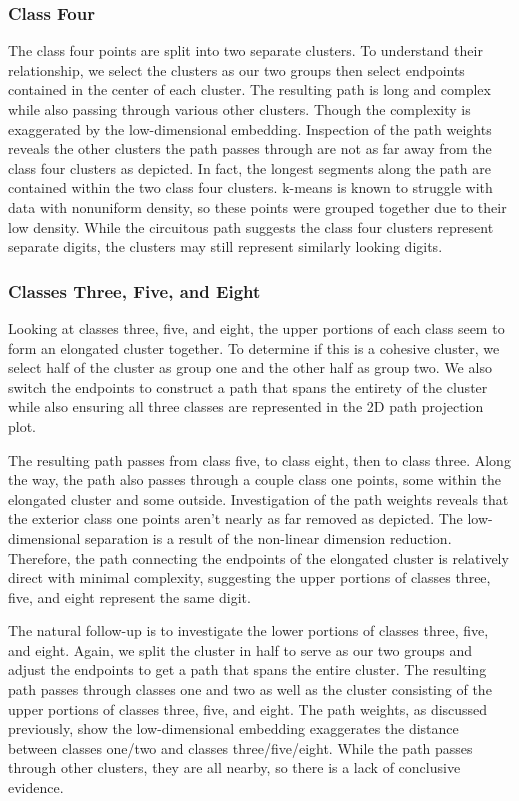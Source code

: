 \documentclass{article}
\begin{document}
\subsubsection{Class Four}
The class four points are split into two separate clusters. To understand their relationship, we select the clusters as our two groups then select endpoints contained in the center of each cluster. The resulting path is long and complex while also passing through various other clusters. Though the complexity is exaggerated by the low-dimensional embedding. Inspection of the path weights reveals the other clusters the path passes through are not as far away from the class four clusters as depicted. In fact, the longest segments along the path are contained within the two class four clusters. k-means is known to struggle with data with nonuniform density, so these points were grouped together due to their low density. While the circuitous path suggests the class four clusters represent separate digits, the clusters may still represent similarly looking digits.

\subsubsection{Classes Three, Five, and Eight}
Looking at classes three, five, and eight, the upper portions of each class seem to form an elongated cluster together. To determine if this is a cohesive cluster, we select half of the cluster as group one and the other half as group two. We also switch the endpoints to construct a path that spans the entirety of the cluster while also ensuring all three classes are represented in the 2D path projection plot.

The resulting path passes from class five, to class eight, then to class three. Along the way, the path also passes through a couple class one points, some within the elongated cluster and some outside. Investigation of the path weights reveals that the exterior class one points aren't nearly as far removed as depicted. The low-dimensional separation is a result of the non-linear dimension reduction. Therefore, the path connecting the endpoints of the elongated cluster is relatively direct with minimal complexity, suggesting the upper portions of classes three, five, and eight represent the same digit.

The natural follow-up is to investigate the lower portions of classes three, five, and eight. Again, we split the cluster in half to serve as our two groups and adjust the endpoints to get a path that spans the entire cluster. The resulting path passes through classes one and two as well as the cluster consisting of the upper portions of classes three, five, and eight. The path weights, as discussed previously, show the low-dimensional embedding exaggerates the distance between classes one/two and classes three/five/eight. While the path passes through other clusters, they are all nearby, so there is a lack of conclusive evidence.
\end{document}
